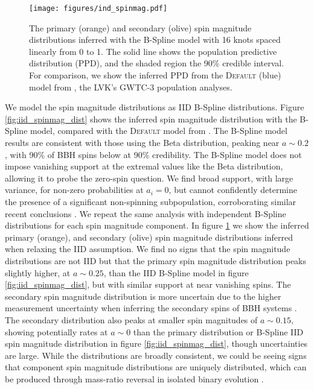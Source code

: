 \begin{figure}[ht!]
    \begin{centering}
        \texttt{[image: figures/ind\_spinmag.pdf]}
        \caption{The primary (orange) and secondary (olive) spin magnitude distributions inferred with the B-Spline model
        with 16 knots spaced linearly from 0 to 1. The solid line shows the population predictive distribution (PPD), and the shaded region the 90\% credible interval. 
        For comparison, we show the inferred PPD from the \textsc{Default} (blue) model from \citet{o3b_astro_dist}, the LVK's GWTC-3 population analyses.}
        \label{fig:ind_spinmag_dist}
    \end{centering}
\end{figure}

We model the spin magnitude distributions as IID B-Spline distributions. 
Figure \ref{fig:iid_spinmag_dist} shows the inferred spin magnitude distribution with the B-Spline model, compared with the \textsc{Default} model from \citet{o3b_astro_dist}. 
The B-Spline model results are consistent with those using the Beta distribution, peaking near $a\sim0.2$, with 90\% of BBH spins below 
\result{$\CIPlusMinus{\macros[BSplineIIDCompSpins][a_90percentile]}$} at 90\% credibility. The B-Spline model does not impose vanishing support at the extremal values like the Beta distribution, 
allowing it to probe the zero-spin question. We find broad support, with large variance, for non-zero probabilities at $a_i=0$, but cannot confidently determine the presence of 
a significant non-spinning subpopulation, corroborating similar recent conclusions \citep{BuildBetterSpinModels,Callister_NoEvidence,GWTC3MonashSpin,Mould2022}. 
We repeat the same analysis with independent B-Spline distributions for each spin magnitude component. In figure \ref{fig:ind_spinmag_dist} 
we show the inferred primary (orange), and secondary (olive) spin magnitude distributions inferred when relaxing the IID assumption. We find no signs that the spin magnitude distributions are not IID but that the primary spin magnitude distribution peaks slightly higher, at $a\sim0.25$, than the IID B-Spline model in figure \ref{fig:iid_spinmag_dist}, but with similar support at near vanishing spins. The secondary spin magnitude distribution is more uncertain due to the 
higher measurement uncertainty when inferring the secondary spins of BBH systems \citep{1403.0129,1611.01122}. The secondary distribution also peaks at smaller spin magnitudes of $a\sim0.15$, showing potentially rates at $a\sim0$ than the primary distribution or B-Spline IID spin magnitude distribution in figure \ref{fig:iid_spinmag_dist}, though uncertainties are large. While the distributions are broadly consistent, we could be seeing signs that component spin magnitude distributions are uniquely distributed, which can be produced through mass-ratio reversal in isolated binary evolution \citep{Mould2022}.

